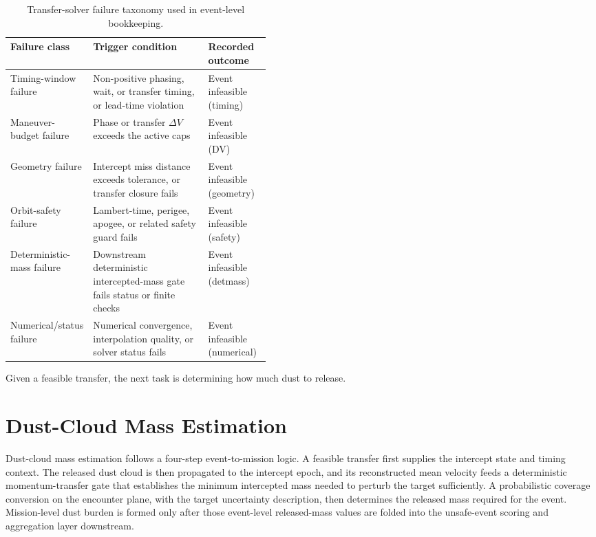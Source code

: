     \begin{table}[htb]
        \centering
        \caption[Transfer-solver failure taxonomy]{Transfer-solver failure taxonomy used in event-level bookkeeping.}
        \label{tab:transfer_failure_taxonomy}
        \begin{tabularx}{0.94\linewidth}{@{}L{0.20\linewidth}Y L{0.24\linewidth}@{}}
            \toprule
            \textbf{Failure class} & \textbf{Trigger condition} & \textbf{Recorded outcome} \\
            \midrule
            Timing-window failure & Non-positive phasing, wait, or transfer timing, or lead-time violation & Event infeasible (timing) \\
            Maneuver-budget failure & Phase or transfer \(\Delta V\) exceeds the active caps & Event infeasible (DV) \\
            Geometry failure & Intercept miss distance exceeds tolerance, or transfer closure fails & Event infeasible (geometry) \\
            Orbit-safety failure & Lambert-time, perigee, apogee, or related safety guard fails & Event infeasible (safety) \\
            Deterministic-mass failure & Downstream deterministic intercepted-mass gate fails status or finite checks & Event infeasible (detmass) \\
            Numerical/status failure & Numerical convergence, interpolation quality, or solver status fails & Event infeasible (numerical) \\
            \bottomrule
        \end{tabularx}
    \end{table}

    \clearpage

    Given a feasible transfer, the next task is determining how much dust to release.

\section{Dust-Cloud Mass Estimation} \label{se:dustmass}
    Dust-cloud mass estimation follows a four-step event-to-mission logic. A feasible transfer first supplies the intercept state and timing context. The released dust cloud is then propagated to the intercept epoch, and its reconstructed mean velocity feeds a deterministic momentum-transfer gate that establishes the minimum intercepted mass needed to perturb the target sufficiently. A probabilistic coverage conversion on the encounter plane, with the target uncertainty description, then determines the released mass required for the event. Mission-level dust burden is formed only after those event-level released-mass values are folded into the unsafe-event scoring and aggregation layer downstream.

